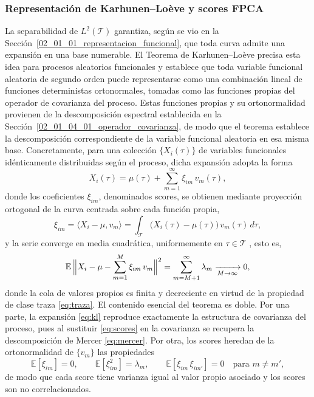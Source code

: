 \subsubsection{Representación de Karhunen--Loève y scores FPCA}
\label{02_01_04_02_karhunen_loeve_scores}
La separabilidad de $L^2(\mathcal{T})$ garantiza, según se vio en la Sección~\ref{02_01_01_representacion_funcional}, que toda curva admite una expansión en una base numerable. El Teorema de Karhunen--Loève \citep{02_01_kokoszka2017introduction} precisa esta idea para procesos aleatorios funcionales y establece que toda variable funcional aleatoria de segundo orden puede representarse como una combinación lineal de funciones deterministas ortonormales, tomadas como las funciones propias del operador de covarianza del proceso. Estas funciones propias y su ortonormalidad provienen de la descomposición espectral establecida en la Sección~\ref{02_01_04_01_operador_covarianza}, de modo que el teorema establece la descomposición correspondiente de la variable funcional aleatoria en esa misma base. Concretamente, para una colección $\{X_i(\tau)\}$ de variables funcionales idénticamente distribuidas según el proceso, dicha expansión adopta la forma
\begin{equation}\label{eq:kl}
    X_i(\tau) = \mu(\tau) + \sum_{m=1}^{\infty}
    \xi_{im}\, v_m(\tau),
\end{equation}
donde los coeficientes $\xi_{im}$, denominados scores, se obtienen mediante proyección ortogonal de la curva centrada sobre cada función propia,
\begin{equation}\label{eq:scores}
    \xi_{im} = \langle X_i - \mu, v_m \rangle
    = \int_{\mathcal{T}}
    \bigl(X_i(\tau) - \mu(\tau)\bigr)\, v_m(\tau)\, d\tau,
\end{equation}
y la serie converge en media cuadrática, uniformemente en $\tau \in \mathcal{T}$ \citep{02_01_kokoszka2017introduction}, esto es,
\begin{equation}
    \mathbb{E}\,\Bigl\| X_i - \mu - \sum_{m=1}^{M}\xi_{im}\,v_m \Bigr\|^2
    = \sum_{m=M+1}^{\infty}\lambda_m \xrightarrow[M \to \infty]{} 0,
\end{equation}
donde la cola de valores propios es finita y decreciente en virtud de la propiedad de clase traza \eqref{eq:traza}. El contenido esencial del teorema es doble. Por una parte, la expansión \eqref{eq:kl} reproduce exactamente la estructura de covarianza del proceso, pues al sustituir \eqref{eq:scores} en la covarianza se recupera la descomposición de Mercer \eqref{eq:mercer}. Por otra, los scores heredan de la ortonormalidad de $\{v_m\}$ las propiedades \citep{02_01_kokoszka2017introduction}
\begin{equation}
    \mathbb{E}[\xi_{im}] = 0,
    \qquad
    \mathbb{E}[\xi_{im}^2] = \lambda_m,
    \qquad
    \mathbb{E}[\xi_{im}\, \xi_{im'}] = 0 \quad \text{para } m \neq m',
\end{equation}
de modo que cada score tiene varianza igual al valor propio asociado y los scores son no correlacionados.\\

